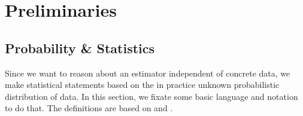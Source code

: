 \documentclass[10pt]{article}
\theoremstyle{definition}
\begin{document}



\section{Preliminaries}


\subsection{Probability \& Statistics}


Since we want to reason about an estimator independent of concrete data,
we make statistical statements based on the in practice unknown
probabilistic distribution of data. In this section, we fixate some basic
language and notation to do that. The definitions are based on
\cite{wasserman_AllStatisticsConcise_2010} and
\cite{gyorfi_DistributionFreeTheoryNonparametric_2002}.
\end{document}
